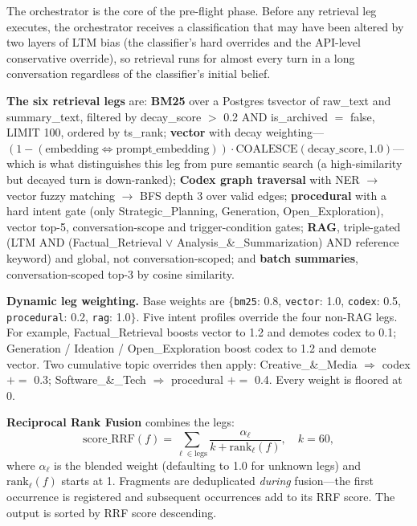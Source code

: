 \documentclass[10pt]{article}
\begin{document}
The orchestrator is the core of the pre-flight phase. Before any retrieval leg executes, the orchestrator receives a classification that may have been altered by two layers of LTM bias (the classifier's hard overrides and the API-level conservative override), so retrieval runs for almost every turn in a long conversation regardless of the classifier's initial belief.

\textbf{The six retrieval legs} are: \textbf{BM25} over a Postgres tsvector of raw\_text and summary\_text, filtered by decay\_score $>$ 0.2 AND is\_archived $=$ false, LIMIT 100, ordered by ts\_rank; \textbf{vector} with decay weighting---$(1 - (\text{embedding} \Leftrightarrow \text{prompt\_embedding})) \cdot \text{COALESCE}(\text{decay\_score}, 1.0)$---which is what distinguishes this leg from pure semantic search (a high-similarity but decayed turn is down-ranked); \textbf{Codex graph traversal} with NER $\rightarrow$ vector fuzzy matching $\rightarrow$ BFS depth 3 over valid edges; \textbf{procedural} with a hard intent gate (only Strategic\_Planning, Generation, Open\_Exploration), vector top-5, conversation-scope and trigger-condition gates; \textbf{RAG}, triple-gated (LTM AND (Factual\_Retrieval $\lor$ Analysis\_\&\_Summarization) AND reference keyword) and global, not conversation-scoped; and \textbf{batch summaries}, conversation-scoped top-3 by cosine similarity.

\textbf{Dynamic leg weighting.} Base weights are $\{$\texttt{bm25}: 0.8, \texttt{vector}: 1.0, \texttt{codex}: 0.5, \texttt{procedural}: 0.2, \texttt{rag}: 1.0$\}$. Five intent profiles override the four non-RAG legs. For example, Factual\_Retrieval boosts vector to 1.2 and demotes codex to 0.1; Generation / Ideation / Open\_Exploration boost codex to 1.2 and demote vector. Two cumulative topic overrides then apply: Creative\_\&\_Media $\Rightarrow$ codex $+=$ 0.3; Software\_\&\_Tech $\Rightarrow$ procedural $+=$ 0.4. Every weight is floored at 0.

\textbf{Reciprocal Rank Fusion} combines the legs:
\begin{equation}
\mathrm{score\_RRF}(f) = \sum_{\ell \in \mathrm{legs}} \frac{\alpha_\ell}{k + \mathrm{rank}_\ell(f)}, \quad k = 60,
\end{equation}
where $\alpha_\ell$ is the blended weight (defaulting to 1.0 for unknown legs) and $\mathrm{rank}_\ell(f)$ starts at 1. Fragments are deduplicated \emph{during} fusion---the first occurrence is registered and subsequent occurrences add to its RRF score. The output is sorted by RRF score descending.
\end{document}
